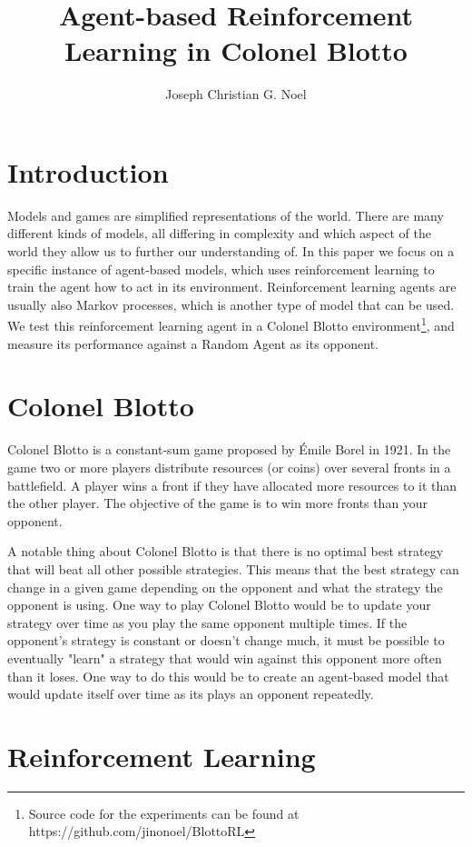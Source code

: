 \documentclass[11pt, oneside]{article}   	%
\title{Agent-based Reinforcement Learning in Colonel Blotto}
\author{Joseph Christian G. Noel}
\date{}							%
\begin{document}
\maketitle

\section{Introduction}

Models and games are simplified representations of the world. There are many different kinds of models, all differing in complexity and which aspect of the world they allow us to further our understanding of. In this paper we focus on a specific instance of agent-based models, which uses reinforcement learning to train the agent how to act in its environment. Reinforcement learning agents are usually also Markov processes, which is another type of model that can be used. We test this reinforcement learning agent in a Colonel Blotto environment\footnote{Source code for the experiments can be found at https://github.com/jinonoel/BlottoRL}, and measure its performance against a Random Agent as its opponent. 
\section{Colonel Blotto}


Colonel Blotto is a constant-sum game proposed by Émile Borel in 1921\cite{Borel1953}. In the game two or more players distribute resources (or coins) over several fronts in a battlefield. A player wins a front if they have allocated more resources to it than the other player. The objective of the game is to win more fronts than your opponent.

\hfill

A notable thing about Colonel Blotto is that there is no optimal best strategy that will beat all other possible strategies. This means that the best strategy can change in a given game depending on the opponent and what the strategy the opponent is using. One way to play Colonel Blotto would be to update your strategy over time as you play the same opponent multiple times. If the opponent's strategy is constant or doesn't change much, it must be possible to eventually "learn" a strategy that would win against this opponent more often than it loses. One way to do this would be to create an agent-based model that would update itself over time as its plays an opponent repeatedly.

\section{Reinforcement Learning}
\end{document}
